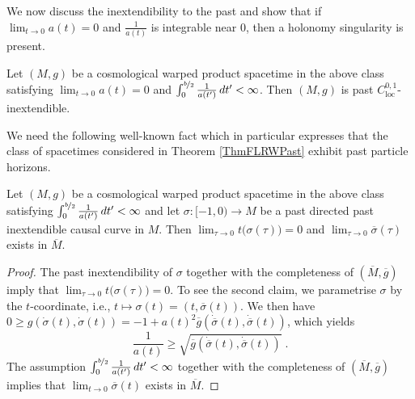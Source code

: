 \documentclass[reqno]{article}
\newcommand{\loc}{\mathrm{loc}}
\begin{document}
We now discuss the inextendibility to the past and show that if  $\lim_{t \to 0} a(t) = 0$ and $\frac{1}{a(t)}$ is integrable near $0$, then a holonomy singularity is present. 

\begin{theorem}\label{ThmFLRWPast}
Let $(M,g)$ be a cosmological warped product spacetime in the above class satisfying  $\lim_{t \to 0} a(t) = 0$ and $\int_0^{\nicefrac{b}{2}} \frac{1}{a(t')} \, dt' < \infty$. Then $(M,g)$ is past $C^{0,1}_{\loc}$-inextendible.
\end{theorem}

We need the following well-known fact which in particular expresses that the class of spacetimes considered in Theorem \ref{ThmFLRWPast} exhibit past particle horizons.

\begin{lemma}\label{LemHorizon}
Let $(M,g)$ be a cosmological warped product spacetime in the above class satisfying $\int_0^{\nicefrac{b}{2}} \frac{1}{a(t')} \, dt' < \infty$ and let $\sigma : [-1,0) \to M$ be a past directed past inextendible causal curve in $M$. Then $\lim_{\tau \to 0} t\big(\sigma(\tau)\big) = 0$ and $\lim_{\tau \to 0} \overline{\sigma}(\tau)$ exists in $\overline{M}$.
\end{lemma}

\begin{proof}
The past inextendibility  of $\sigma$ together with the completeness of $(\overline{M}, \overline{g})$ imply that $\lim_{\tau \to 0} t\big(\sigma(\tau)\big) = 0$. To see the second claim, we parametrise $\sigma$ by the $t$-coordinate, i.e., $t \mapsto \sigma(t) = (t, \overline{\sigma}(t))$. We then have $0 \geq g(\dot{\sigma}(t), \dot{\sigma}(t)) = -1 + a(t)^2 \overline{g}(\dot{\overline{\sigma}}(t), \dot{\overline{\sigma}}(t))$, which yields $$\frac{1}{a(t)} \geq \sqrt{\overline{g}(\dot{\overline{\sigma}}(t), \dot{\overline{\sigma}}(t))} \;.$$
The assumption $\int_0^{\nicefrac{b}{2}} \frac{1}{a(t')} \, dt' < \infty$ together with the completeness of $(\overline{M}, \overline{g})$ implies that $\lim_{t \to 0} \overline{\sigma}(t)$ exists in $\overline{M}$. 
\end{proof}
 
\end{document}

